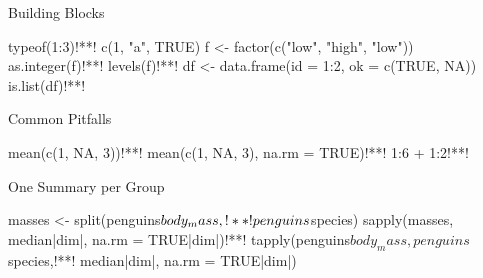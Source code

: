 \begin{frame}[fragile]{Building Blocks}
\begin{minipage}{.6\textwidth}
\footnotesize
\begin{rsession}
typeof(1:3)!**!
c(1, "a", TRUE)
f <- factor(c("low", "high", "low"))
as.integer(f)!**!
levels(f)!**!
df <- data.frame(id = 1:2, ok = c(TRUE, NA))
is.list(df)!**!
\end{rsession}
\end{minipage}
\end{frame}


\begin{frame}[fragile]{Common Pitfalls}
\begin{minipage}{.6\textwidth}
\footnotesize
\begin{rsession}
mean(c(1, NA, 3))!**!
mean(c(1, NA, 3), na.rm = TRUE)!**!
1:6 + 1:2!**!
\end{rsession}
\end{minipage}
\end{frame}

\begin{frame}[fragile]{One Summary per Group}
\begin{minipage}{.6\textwidth}
\footnotesize
\begin{rsession}
masses <- split(penguins$body_mass,!*\CodeMark{split}*!
  penguins$species)
sapply(masses, median|dim|, na.rm = TRUE|dim|)!**!
tapply(penguins$body_mass, penguins$species,!**!
  median|dim|, na.rm = TRUE|dim|)
\end{rsession}
\end{minipage}
\end{frame}

